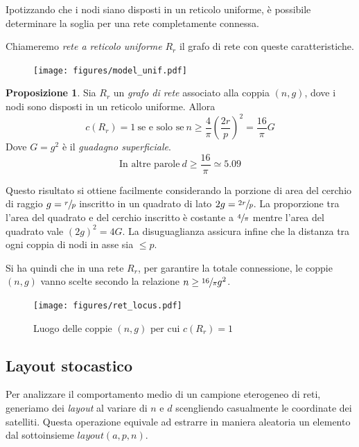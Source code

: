 \documentclass[a4paper,12pt]{article}
\theoremstyle{definition}
\newtheorem{proposition}{Proposizione}
\begin{document}
Ipotizzando che i nodi siano disposti in un reticolo uniforme, è possibile determinare la soglia per una rete completamente connessa.

Chiameremo \emph{rete a reticolo uniforme} $R_r$ il grafo di rete con queste caratteristiche.

\begin{figure}[H]
\centering
\texttt{[image: figures/model\_unif.pdf]}
\caption{}
\end{figure}

\begin{proposition}
Sia $R_r$ un \emph{grafo di rete} associato alla coppia $(n, g)$, dove i nodi sono disposti in un reticolo uniforme. Allora
\begin{equation*}
c(R_r) = 1 \ \text{se e solo se} \ n \geq \frac{4}{\pi} \left(\frac{2r}{p}\right)^2 = \frac{16}{\pi} G
\end{equation*}
Dove $G = g^2$ è il \emph{guadagno superficiale}.
\begin{equation*}
\text{In altre parole} \ d \geq \frac{16}{\pi} \simeq 5.09
\end{equation*}
\end{proposition}

Questo risultato si ottiene facilmente considerando la porzione di area del cerchio di raggio $g = \sfrac{r}{p}$ inscritto in un quadrato di lato $2g = \sfrac{2r}{p}$. La proporzione tra l'area del quadrato e del cerchio inscritto è costante a $\sfrac{4}{\pi}$ mentre l'area del quadrato vale $(2g)^2 = 4G$. La disuguaglianza assicura infine che la distanza tra ogni coppia di nodi in asse sia $\leq p$.

Si ha quindi che in una rete $R_r$, per garantire la totale connessione, le coppie $(n, g)$ vanno scelte secondo la relazione $n \geq \sfrac{16}{\pi} g^2$.

\begin{figure}[H]
\centering
\texttt{[image: figures/ret\_locus.pdf]}
\caption{Luogo delle coppie $(n, g)$ per cui $c(R_r) = 1$}
\end{figure}

\subsection{Layout stocastico}

Per analizzare il comportamento medio di un campione eterogeneo di reti, generiamo dei \emph{layout} al variare di $n$ e $d$ scengliendo casualmente le coordinate dei satelliti. Questa operazione equivale ad estrarre in maniera aleatoria un elemento dal sottoinsieme $layout(a, p, n)$.
\end{document}
